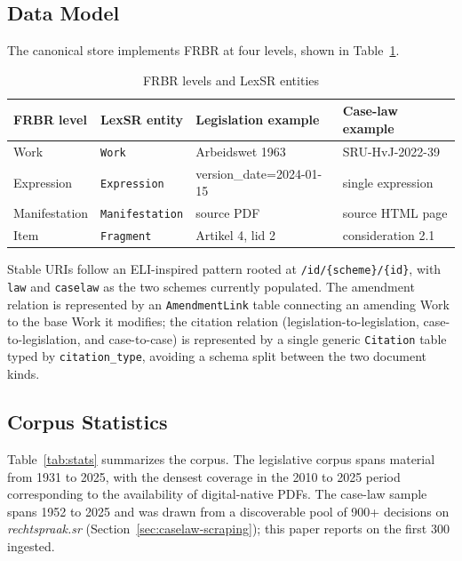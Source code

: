 \documentclass{IOS-Book-Article}
\begin{document}
\subsection{Data Model}

The canonical store implements FRBR at four levels, shown in Table~\ref{tab:frbr}.

\begin{table}[h]
\caption{FRBR levels and LexSR entities}
\label{tab:frbr}
\begin{tabular}{|l|l|l|l|}
\hline
\textbf{FRBR level} & \textbf{LexSR entity} & \textbf{Legislation example} & \textbf{Case-law example} \\
\hline
Work & \texttt{Work} & Arbeidswet 1963 & SRU-HvJ-2022-39 \\
Expression & \texttt{Expression} & version\_date=2024-01-15 & single expression \\
Manifestation & \texttt{Manifestation} & source PDF & source HTML page \\
Item & \texttt{Fragment} & Artikel 4, lid 2 & consideration 2.1 \\
\hline
\end{tabular}
\end{table}

Stable URIs follow an ELI-inspired pattern rooted at \texttt{/id/\{scheme\}/\{id\}}, with
\texttt{law} and \texttt{caselaw} as the two schemes currently populated. The amendment relation is
represented by an \texttt{AmendmentLink} table connecting an amending Work to the base Work it
modifies; the citation relation (legislation-to-legislation, case-to-legislation, and
case-to-case) is represented by a single generic \texttt{Citation} table typed by
\texttt{citation\_type}, avoiding a schema split between the two document kinds.

\subsection{Corpus Statistics}

Table~\ref{tab:stats} summarizes the corpus. The legislative corpus spans material from 1931 to 2025, with the densest coverage in the
2010 to 2025 period corresponding to the availability of digital-native PDFs. The case-law
sample spans 1952 to 2025 and was drawn from a discoverable pool of 900+ decisions on
\emph{rechtspraak.sr} (Section~\ref{sec:caselaw-scraping}); this paper reports on the first 300 ingested.
\end{document}
